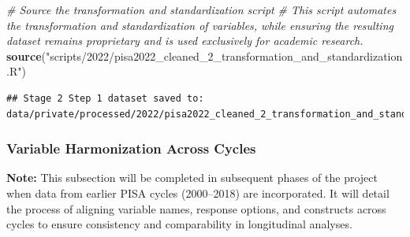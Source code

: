 \documentclass[
]{article}
\newenvironment{Shaded}{\begin{snugshade}}{\end{snugshade}}
\newcommand{\AttributeTok}[1]{\textcolor[rgb]{0.13,0.29,0.53}{#1}}
\newcommand{\CommentTok}[1]{\textcolor[rgb]{0.56,0.35,0.01}{\textit{#1}}}
\newcommand{\ConstantTok}[1]{\textcolor[rgb]{0.56,0.35,0.01}{#1}}
\newcommand{\FunctionTok}[1]{\textcolor[rgb]{0.13,0.29,0.53}{\textbf{#1}}}
\newcommand{\NormalTok}[1]{#1}
\newcommand{\OtherTok}[1]{\textcolor[rgb]{0.56,0.35,0.01}{#1}}
\newcommand{\SpecialCharTok}[1]{\textcolor[rgb]{0.81,0.36,0.00}{\textbf{#1}}}
\newcommand{\StringTok}[1]{\textcolor[rgb]{0.31,0.60,0.02}{#1}}
\begin{document}
\begin{Shaded}
\end{Shaded}

\begin{Shaded}
\begin{Highlighting}[]
\CommentTok{\# Source the transformation and standardization script}
\CommentTok{\# This script automates the transformation and standardization of variables, while ensuring the resulting dataset remains proprietary and is used exclusively for academic research.}
\FunctionTok{source}\NormalTok{(}\StringTok{"scripts/2022/pisa2022\_cleaned\_2\_transformation\_and\_standardization.R"}\NormalTok{)}
\end{Highlighting}
\end{Shaded}

\begin{verbatim}
## Stage 2 Step 1 dataset saved to: data/private/processed/2022/pisa2022_cleaned_2_transformation_and_standardization.csv
\end{verbatim}

\hypertarget{variable-harmonization-across-cycles}{%
\subsubsection{Variable Harmonization Across
Cycles}\label{variable-harmonization-across-cycles}}

\textbf{Note:} This subsection will be completed in subsequent phases of
the project when data from earlier PISA cycles (2000--2018) are
incorporated. It will detail the process of aligning variable names,
response options, and constructs across cycles to ensure consistency and
comparability in longitudinal analyses.
\end{document}
